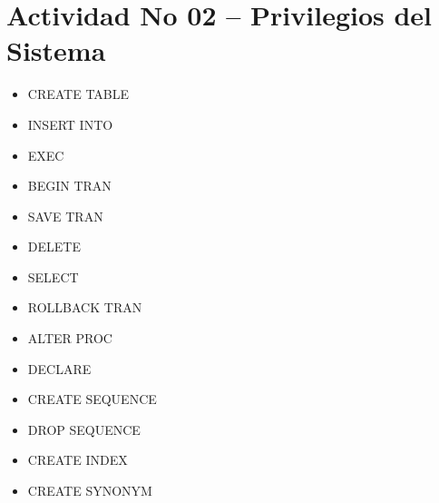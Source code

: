 \section{Actividad No 02 – Privilegios del Sistema}

\begin{itemize}
\item CREATE TABLE
\item INSERT INTO
\item EXEC
\item BEGIN TRAN
\item SAVE TRAN
\item DELETE
\item SELECT
\item ROLLBACK TRAN
\item ALTER PROC
\item DECLARE
\item CREATE SEQUENCE
\item DROP SEQUENCE
\item CREATE INDEX
\item CREATE SYNONYM
\end{itemize} 

